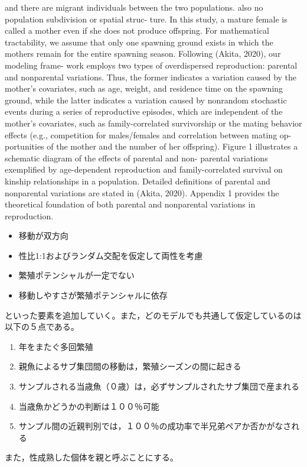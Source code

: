 \documentclass[12pt, English]{article}
\begin{document}
\begin{spacing}{1.9}
and there are migrant individuals between the two populations. also no population subdivision or spatial struc- ture. In this study, a mature female is called a mother even if she does not produce offspring. For mathematical tractability, we assume that only one spawning ground exists in which the mothers remain for the entire spawning season. Following (Akita, 2020), our modeling frame- work employs two types of overdispersed reproduction: parental and nonparental variations. Thus, the former indicates a variation caused by the mother's covariates, such as age, weight, and residence time on the spawning ground, while the latter indicates a variation caused by nonrandom stochastic events during a series of reproductive episodes, which are independent of the mother's covariates, such as family-correlated survivorship or the mating behavior effects (e.g., competition for males/females and correlation between mating op- portunities of the mother and the number of her offspring). Figure 1 illustrates a schematic diagram of the effects of parental and non- parental variations exemplified by age-dependent reproduction and family-correlated survival on kinship relationships in a population. Detailed definitions of parental and nonparental variations are stated in (Akita, 2020). Appendix 1 provides the theoretical foundation of both parental and nonparental variations in reproduction.

\begin{itemize}
  \item 移動が双方向
  \item 性比1:1およびランダム交配を仮定して両性を考慮
  \item 繁殖ポテンシャルが一定でない
  \item 移動しやすさが繁殖ポテンシャルに依存
\end{itemize}
といった要素を追加していく。また，どのモデルでも共通して仮定しているのは以下の５点である。
\begin{enumerate}
  \item 年をまたぐ多回繁殖
  \item 親魚によるサブ集団間の移動は，繁殖シーズンの間に起きる
  \item サンプルされる当歳魚（０歳）は，必ずサンプルされたサブ集団で産まれる
  \item 当歳魚かどうかの判断は１００％可能
  \item サンプル間の近親判別では，１００％の成功率で半兄弟ペアか否かがなされる
\end{enumerate}
また，性成熟した個体を親と呼ぶことにする。




\end{spacing}
\end{document}
